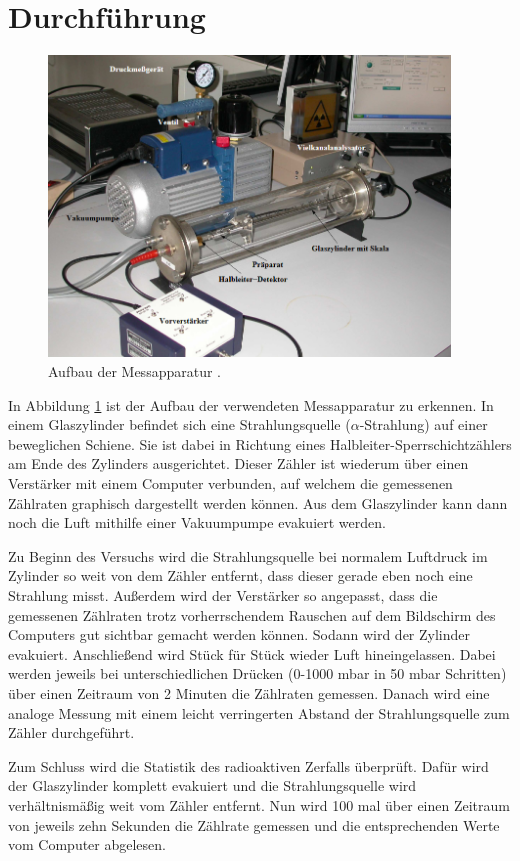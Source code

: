 \section{Durchführung}
\label{sec:Durchführung}

\begin{figure}[H]
  \centering
  \includegraphics[height=8cm]{Aufbau.PNG}
  \caption{Aufbau der Messapparatur \cite{sample}.}
  \label{fig:aufbau}
\end{figure}

In Abbildung \ref{fig:aufbau} ist der Aufbau der verwendeten Messapparatur zu erkennen.
In einem Glaszylinder befindet sich eine Strahlungsquelle ($\alpha$-Strahlung) auf einer
beweglichen Schiene. Sie ist dabei in Richtung eines Halbleiter-Sperrschichtzählers am Ende
des Zylinders ausgerichtet. Dieser Zähler ist wiederum über einen Verstärker mit einem
Computer verbunden, auf welchem die gemessenen Zählraten graphisch dargestellt werden können.
Aus dem Glaszylinder kann dann noch die Luft mithilfe einer Vakuumpumpe evakuiert werden.

Zu Beginn des Versuchs wird die Strahlungsquelle bei normalem Luftdruck im Zylinder so weit
von dem Zähler entfernt, dass dieser gerade eben noch eine Strahlung misst. Außerdem wird
der Verstärker so angepasst, dass die gemessenen Zählraten trotz vorherrschendem Rauschen auf
dem Bildschirm des Computers gut sichtbar gemacht werden können. Sodann wird
der Zylinder evakuiert. Anschließend wird Stück für Stück wieder Luft hineingelassen.
Dabei werden jeweils bei unterschiedlichen Drücken (0-1000 mbar in 50 mbar Schritten)
über einen Zeitraum von 2 Minuten die Zählraten gemessen.
Danach wird eine analoge Messung mit einem leicht verringerten Abstand der Strahlungsquelle
zum Zähler durchgeführt.

Zum Schluss wird die Statistik des radioaktiven Zerfalls überprüft. Dafür wird der
Glaszylinder komplett evakuiert und die Strahlungsquelle wird verhältnismäßig weit vom
Zähler entfernt. Nun wird 100 mal über einen Zeitraum von jeweils zehn Sekunden die
Zählrate gemessen und die entsprechenden Werte vom Computer abgelesen.

